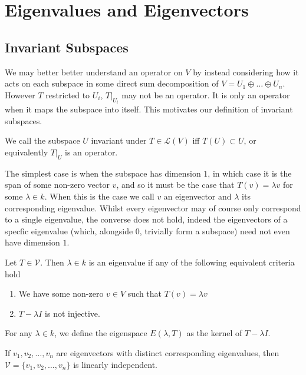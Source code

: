 \documentclass[]{article}
\begin{document}
\section{Eigenvalues and Eigenvectors}

\subsection{Invariant Subspaces}

We may better better understand an operator on $V$ by instead considering how it acts on each subspace in some direct sum decomposition of $V = U_1 \oplus \ldots \oplus U_n$. However $T$ restricted to $U_i$, $T|_{U_i}$ may not be an operator. It is only an operator when it maps the subspace into itself. This motivates our definition of invariant subspaces.

\begin{defi} 
		We call the subspace $U$ invariant under $T \in \mathcal{L}(V)$ iff $T(U) \subset U$, or equivalently $T|_U$ is an operator.
\end{defi}

The simplest case is when the subspace has dimension $1$, in which case it is the span of some non-zero vector $v$, and so it must be the case that $T(v) = \lambda v$ for some $\lambda \in k$. When this is the case we call $v$ an eigenvector and $\lambda$ its corresponding eigenvalue. Whilst every eigenvector may of course only correspond to a single eigenvalue, the converse does not hold, indeed the eigenvectors of a specfic eigenvalue (which, alongside $0$, trivially form a subspace) need not even have dimension $1$.

\begin{defi}
		Let $T \in \mathcal{V}$. Then $\lambda \in k$ is an eigenvalue if any of the following equivalent criteria hold
		\begin{enumerate}
				\item We have some non-zero $v \in V$ such that $T(v) = \lambda v$ 
				\item $T - \lambda I$ is not injective.
		\end{enumerate}

		For any $\lambda \in k$, we define the eigenspace $E(\lambda, T)$ as the kernel of $T - \lambda I$. 
\end{defi}

\begin{thm}
		If $v_1, v_2, \ldots, v_n$ are eigenvectors with distinct corresponding eigenvalues, then $\mathcal{V} = \{v_1, v_2, \ldots, v_n\}$ is linearly independent.
\end{thm}
\end{document}
